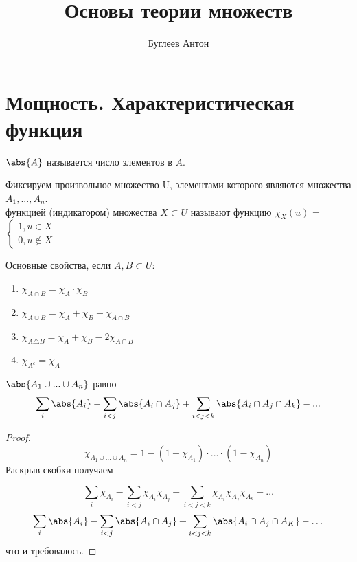 \documentclass[a4paper, 14pt]{article}
\title{Основы теории множеств}
\author{Буглеев Антон}
\date{}
\begin{document}
    \maketitle
    \newpage

    \section{Мощность. Характеристическая функция}

    \begin{definition}
        {} $\abs{A}$ называется число элементов в $A$.
    \end{definition}

    \begin{definition}
        Фиксируем произвольное множество U, элементами которого являются множества
        $A_1, ..., A_n$. \\
        { функцией (индикатором)} множества $X \subset U$ называют
        функцию $\chi_X(u)$ = 
        $\begin{cases} 
            1, u \in X \\
            0, u \notin X
        \end{cases}$
    \end{definition}

    Основные свойства, если $A, B \subset U$:
    \begin{enumerate}
        \item $\chi_{A \cap B} = \chi_A \cdot \chi_B$
        \item $\chi_{A\cup B} = \chi_A + \chi_B - \chi_{A \cap B}$
        \item $\chi_{A\triangle B} = \chi_A + \chi_B - 2\chi_{A \cap B}$
        \item $\chi_{A^c} = \chi_A$
    \end{enumerate}

    \begin{theorem} $\abs{A_1 \cup ... \cup A_n}$ равно
        \[
        \sum_{i} \abs{A_i} - 
        \sum_{i<j} \abs{A_i \cap A_j} + 
        \sum_{i<j<k} \abs{A_i \cap A_j \cap A_k} - ...
        \]
    \end{theorem}
    \begin{proof}[Proof]
        \[ \chi_{A_1 \cup ... \cup A_n} = 1 - (1 - \chi_{A_1}) \cdot ... \cdot (1 - \chi_{A_n}) \]
        Раскрыв скобки получаем

        \[
            \sum_{i} \chi_{A_i} -
            \sum_{i < j} \chi_{A_i}\chi_{A_j} +
            \sum_{i < j < k} \chi_{A_i}\chi_{A_j}\chi_{A_k}  - \dots  
        \]
        \[ 
        \sum_{i} \abs{A_i} -
        \sum_{i<j}  \abs{A_i \cap A_j} +
        \sum_{i<j<k} \abs{A_i \cap A_j \cap A_K} - \dots
        \] что и требовалось.
    \end{proof}
\end{document}
